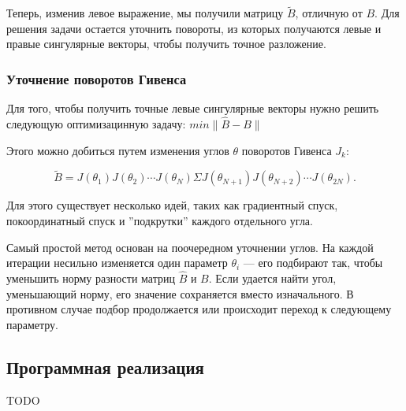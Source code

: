 Теперь, изменив левое выражение, мы получили матрицу $\tilde{B}$, отличную от $B$. Для решения задачи остается уточнить повороты, из которых получаются левые и правые сингулярные векторы, чтобы получить точное разложение.

\subsubsection{Уточнение поворотов Гивенса}

Для того, чтобы получить точные левые сингулярные векторы нужно решить следующую оптимизацинную задачу:
\( 
min\| \widehat{B} - B \| 
\)

Этого можно добиться путем изменения углов \( \theta \) поворотов Гивенса \( J_k \):

\begin{equation}
\tilde{B} = J(\theta_1) J(\theta_2) \cdots J(\theta_N) \Sigma J(\theta_{N+1}) J(\theta_{N+2}) \cdots J(\theta_{2N}).
\end{equation}

Для этого существует несколько идей, таких как градиентный спуск, покоординатный спуск и ''подкрутки'' каждого отдельного угла.

Самый простой метод основан на поочередном уточнении углов. На каждой итерации несильно изменяется один параметр $\theta_i$ --- его подбирают так, чтобы уменьшить норму разности матриц $\widehat{B}$ и $B$. Если удается найти угол, уменьшающий норму, его значение сохраняется вместо изначального. В противном случае подбор продолжается или происходит переход к следующему параметру.

\subsection{Программная реализация}

TODO






